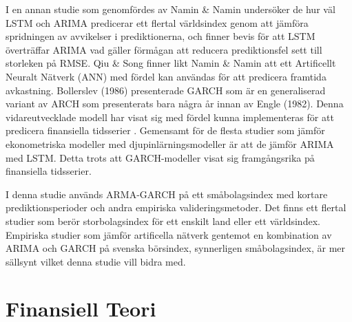 \documentclass[11pt]{article}
\numberwithin{equation}{section}
\numberwithin{table}{section}
\numberwithin{figure}{section}
\begin{document}
I en annan studie som genomfördes av Namin \& Namin \parencite*{siaminamini2018forecasting} undersöker de hur väl LSTM och ARIMA predicerar ett flertal världsindex genom att jämföra spridningen av avvikelser i prediktionerna, och finner bevis för att LSTM överträffar ARIMA vad gäller förmågan att reducera prediktionsfel sett till storleken på RMSE. Qiu \& Song \parencite*{10.1371/journal.pone.0155133} finner likt Namin \& Namin \parencite*{siaminamini2018forecasting} att ett Artificellt Neuralt Nätverk (ANN) med fördel kan användas för att predicera framtida avkastning. Bollerslev (1986) presenterade GARCH som är en generaliserad variant av ARCH som presenterats bara några år innan av Engle (1982). Denna vidareutvecklade modell har visat sig med fördel kunna implementeras för att predicera finansiella tidsserier \parencite{garch}. Gemensamt för de flesta studier som jämför ekonometriska modeller med djupinlärningsmodeller är att de jämför ARIMA med LSTM. Detta trots att GARCH-modeller visat sig framgångsrika på finansiella tidsserier. 

I denna studie används ARMA-GARCH på ett småbolagsindex med kortare prediktionsperioder och andra empiriska valideringsmetoder. Det finns ett flertal studier som berör storbolagsindex för ett enskilt land eller ett världsindex. Empiriska studier som jämför artificella nätverk gentemot en kombination av ARIMA och GARCH på svenska börsindex, synnerligen småbolagsindex, är mer sällsynt vilket denna studie vill bidra med. 






 

\newpage
\section{Finansiell Teori}
\end{document}

